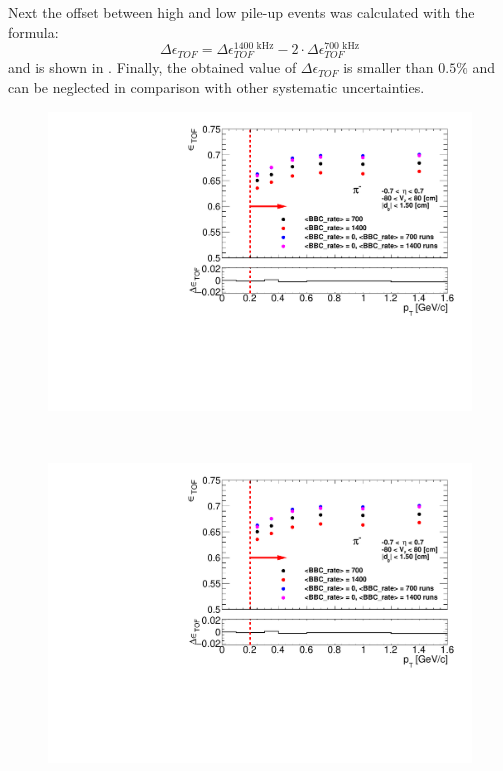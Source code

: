 \noindent Next the offset between high and low pile-up events was calculated with the formula:
\begin{equation}
\Delta\epsilon_{ TOF} =\Delta\epsilon_{ TOF}^{1400\text{ kHz}}-2\cdot\Delta\epsilon_{ TOF}^{700\text{ kHz}}
\label{eq:tofSystDifference}
\end{equation}
 and is shown in .  Finally, the obtained value of $\Delta\epsilon_{ TOF}$ is  smaller than $0.5\%$ and can be neglected in comparison with other systematic uncertainties.
\begin{figure}[hb]
	\centering
	\parbox{0.495\textwidth}{
		\centering
		\includegraphics[width=\linewidth,page=1]{graphics/systematicsEfficiency/bbc_and/tofEffi_d0_1_5_etapt_1.pdf}\\
	}~
	\parbox{0.495\textwidth}{
		\centering
		\includegraphics[width=\linewidth,page=2]{graphics/systematicsEfficiency/bbc_and/tofEffi_d0_1_5_etapt_1.pdf}\\
}
\end{figure}
